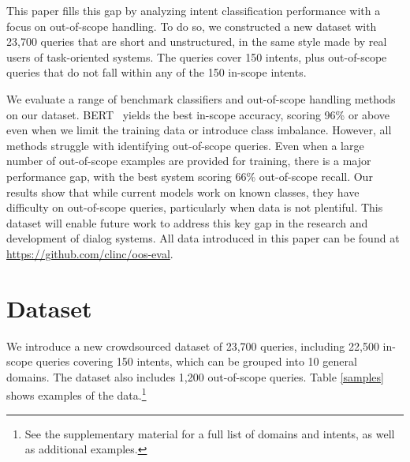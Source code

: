 \documentclass[11pt,a4paper]{article}
\newcommand{\tightparagraph}[1]{\noindent\textbf{#1:}}
\begin{document}
\begin{table}[ht!]
\centering

\caption{\label{samples}
Sample queries from our dataset. The out-of-scope queries are similar in style to the in-scope queries.
}
\end{table}

This paper fills this gap by analyzing intent classification performance with a focus on out-of-scope handling.
To do so, we constructed a new dataset with 23,700 queries that are short and unstructured, in the same style made by real users of task-oriented systems.
The queries cover 150 intents, plus out-of-scope queries that do not fall within any of the 150 in-scope intents.

We evaluate a range of benchmark classifiers and out-of-scope handling methods on our dataset.
BERT~\citep{bert} yields the best in-scope accuracy, scoring 96\% or above even when we limit the training data or introduce class imbalance. 
However, all methods struggle with identifying out-of-scope queries.
Even when a large number of out-of-scope examples are provided for training, there is a major performance gap, with the best system scoring 66\% out-of-scope recall.
Our results show that while current models work on known classes, they have difficulty on out-of-scope queries, particularly when data is not plentiful.
This dataset will enable future work to address this key gap in the research and development of dialog systems. All data introduced in this paper can be found at \url{https://github.com/clinc/oos-eval}.

\section{Dataset}

We introduce a new crowdsourced dataset of 23,700 queries, including 22,500 in-scope queries covering 150 intents, which can be grouped into 10 general domains. The dataset also includes 1,200 out-of-scope queries.
Table \ref{samples} shows examples of the data.\footnote{See the supplementary material for a full list of domains and intents, as well as additional examples.}


\end{document}
